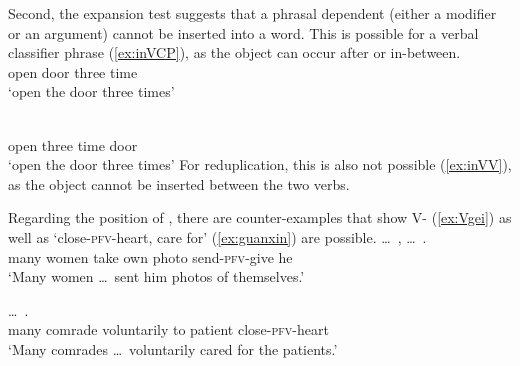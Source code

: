 \documentclass[fleqn,twoside]{article}
\begin{document}
\begin{enumerate}

Second, the expansion test suggests that a phrasal dependent (either a modifier or an argument) cannot be inserted into a word.
This is possible for a verbal classifier phrase (\ref{ex:inVCP}), as the object can occur after or in-between.
\ea\label{ex:inVCP}%
\ea \gll {}   \\
open door three time\\
\glt `open the door three times'

\ex  \gll {}    \\
open three time door\\
\glt `open the door three times'
\z\z
For reduplication, this is also not possible (\ref{ex:inVV}), as the object cannot be inserted between the two verbs.
\ea\label{ex:inVV}

\z\z

Regarding the position of , there are counter-examples that show V- (\ref{ex:Vgei}) as well as  `close-\textsc{pfv}-heart, care for' (\ref{ex:guanxin}) are possible.
\ea\label{ex:Vgei}%
\gll \ldots\,  ,    \ldots\,  .\\
{} many women take own photo {} send-\textsc{pfv}-give he\\
\glt `Many women \ldots\, sent him photos of themselves.'
\z

\ea\label{ex:guanxin}%
\gll {}  \ldots\,    .\\
many comrade {} voluntarily to patient close-\textsc{pfv}-heart\\
\glt `Many comrades \ldots\, voluntarily cared for the patients.'
\z


\end{enumerate}
\end{document}
